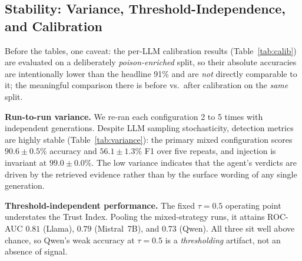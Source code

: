\begin{table}[t]
\caption{$2\times2$ LLM\,$\times$\,embedding grid (TruthfulQA, 100 samples,
mixed, $K{=}3$).}
\label{tab:grid}
\centering {}
\end{table}

\subsection{Stability: Variance, Threshold-Independence, and Calibration}
\label{sec:stability}
Before the tables, one caveat: the per-LLM calibration results (Table~\ref{tab:calib}) are evaluated on a deliberately \emph{poison-enriched} split, so their absolute accuracies are intentionally lower than the headline 91\% and are \emph{not} directly comparable to it; the meaningful comparison there is before vs.\ after calibration on the \emph{same} split.


\textbf{Run-to-run variance.} We re-ran each configuration 2 to 5 times with independent generations. Despite LLM sampling stochasticity, detection metrics are highly stable (Table~\ref{tab:variance}): the primary mixed configuration scores $90.6{\pm}0.5\%$ accuracy and $56.1{\pm}1.3\%$ F1 over five repeats, and injection is invariant at $99.0{\pm}0.0\%$. The low variance indicates that the agent's verdicts are driven by the retrieved evidence rather than by the surface wording of any single generation.


\textbf{Threshold-independent performance.} The fixed $\tau{=}0.5$ operating point understates the Trust Index. Pooling the mixed-strategy runs, it attains ROC-AUC $0.81$ (Llama), $0.79$ (Mistral~7B), and $0.73$ (Qwen). All three sit well above chance, so Qwen's weak accuracy at $\tau{=}0.5$ is a \emph{thresholding} artifact, not an absence of signal.

